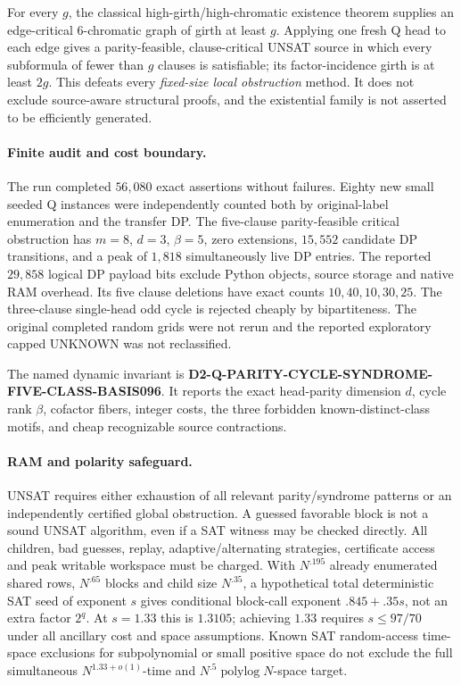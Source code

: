 \documentclass[11pt]{article}
\begin{document}
For every $g$, the classical high-girth/high-chromatic
existence theorem supplies an edge-critical $6$-chromatic
graph of girth at least $g$. Applying one fresh Q head to
each edge gives a parity-feasible, clause-critical UNSAT
source in which every subformula of fewer than $g$ clauses
is satisfiable; its factor-incidence girth is at least $2g$.
This defeats every \emph{fixed-size local obstruction} method.
It does not exclude source-aware structural proofs, and the
existential family is not asserted to be efficiently generated.

\paragraph{Finite audit and cost boundary.}
The run completed $56{,}080$ exact assertions without failures.
Eighty new small seeded Q instances were independently
counted both by original-label enumeration and the transfer DP.
The five-clause parity-feasible critical obstruction has
$m=8$, $d=3$, $\beta=5$, zero extensions, $15{,}552$
candidate DP transitions, and a peak of $1{,}818$
simultaneously live DP entries. The reported $29{,}858$
logical DP payload bits exclude Python objects, source
storage and native RAM overhead. Its five clause deletions
have exact counts $10,40,10,30,25$. The three-clause
single-head odd cycle is rejected cheaply by bipartiteness.
The original completed random grids were not rerun and the
reported exploratory capped UNKNOWN was not reclassified.

The named dynamic invariant is
\textbf{D2-Q-PARITY-CYCLE-SYNDROME-FIVE-CLASS-BASIS096}.
It reports the exact head-parity dimension $d$,
cycle rank $\beta$, cofactor fibers, integer costs,
the three forbidden known-distinct-class motifs,
and cheap recognizable source contractions.

\paragraph{RAM and polarity safeguard.}
UNSAT requires either exhaustion of all relevant
parity/syndrome patterns or an independently certified
global obstruction. A guessed favorable block is not a
sound UNSAT algorithm, even if a SAT witness may be
checked directly. All children, bad guesses, replay,
adaptive/alternating strategies, certificate access and
peak writable workspace must be charged. With
$N^{.195}$ already enumerated shared rows,
$N^{.65}$ blocks and child size $N^{.35}$,
a hypothetical total deterministic SAT seed of exponent $s$
gives conditional block-call exponent $.845+.35s$,
not an extra factor $2^q$.
At $s=1.33$ this is $1.3105$; achieving $1.33$
requires $s\le97/70$ under all ancillary cost and
space assumptions. Known SAT random-access
time-space exclusions for subpolynomial or small
positive space do not exclude the full simultaneous
$N^{1.33+o(1)}$-time and
$N^{.5}\operatorname{polylog}N$-space target.
\end{document}
